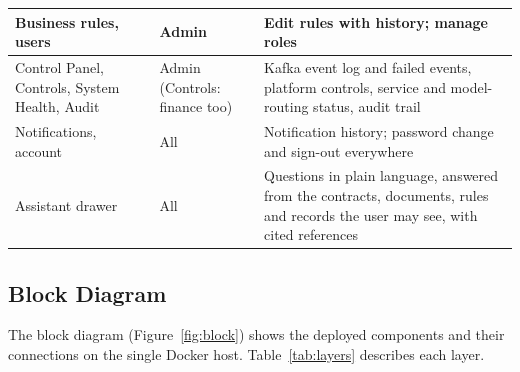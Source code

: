 \begin{table}[H]
\begin{tabularx}{\textwidth}{|L{0.22\textwidth}|L{0.20\textwidth}|Y|}
Business rules, users & Admin & Edit rules with history; manage roles \\ \hline
Control Panel, Controls, System Health, Audit & Admin (Controls: finance too) & Kafka event log and failed events, platform controls, service and model-routing status, audit trail \\ \hline
Notifications, account & All & Notification history; password change and sign-out everywhere \\ \hline
Assistant drawer & All & Questions in plain language, answered from the contracts, documents, rules and records the user may see, with cited references \\ \hline
\end{tabularx}
\end{table}

\subsection{Block Diagram}
The block diagram (Figure~\ref{fig:block}) shows the deployed components and their connections on the single Docker host. Table~\ref{tab:layers} describes each layer.


